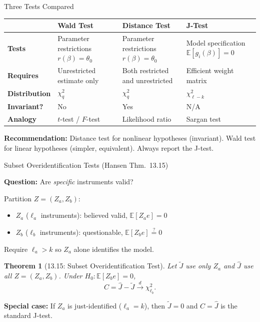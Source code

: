 \documentclass[aspectratio=169, handout]{beamer}
\newtheorem{thm}{Theorem}
\numberwithin{equation}{section}
\begin{document}
\begin{frame}{Three Tests Compared}

\begin{table}[h]
\centering
\small
\begin{tabular}{p{2.8cm}p{3.5cm}p{3cm}p{3.5cm}}
\toprule
& \textbf{Wald Test} & \textbf{Distance Test} & \textbf{J-Test} \\
\midrule
\textbf{Tests} & Parameter restrictions $r(\beta) = \theta_0$ & Parameter restrictions $r(\beta) = \theta_0$ & Model specification $\mathbb{E}[g_i(\beta)] = 0$ \\[4pt]
\textbf{Requires} & Unrestricted estimate only & Both restricted and unrestricted & Efficient weight matrix \\[4pt]
\textbf{Distribution} & $\chi^2_q$ & $\chi^2_q$ & $\chi^2_{\ell - k}$ \\[4pt]
\textbf{Invariant?} & \alert{No} & Yes & N/A \\[4pt]
\textbf{Analogy} & $t$-test / $F$-test & Likelihood ratio & Sargan test \\
\bottomrule
\end{tabular}
\end{table}

\smallskip
\begin{tcolorbox}[colback=blue!5, colframe=blue!50]
\textbf{Recommendation:} Distance test for nonlinear hypotheses (invariant). Wald test for linear hypotheses (simpler, equivalent). Always report the J-test.
\end{tcolorbox}

\end{frame}

\begin{frame}{Subset Overidentification Tests (Hansen Thm.~13.15)}

\textbf{Question:} Are \textit{specific} instruments valid?

\smallskip
Partition $Z = (Z_a, Z_b)$:
\begin{itemize}\itemsep=1pt
\item $Z_a$ ($\ell_a$ instruments): believed valid, $\mathbb{E}[Z_a e] = 0$
\item $Z_b$ ($\ell_b$ instruments): questionable, $\mathbb{E}[Z_b e] \stackrel{?}{=} 0$
\end{itemize}
Require $\ell_a > k$ so $Z_a$ alone identifies the model.

\begin{thm}[13.15: Subset Overidentification Test]
Let $\tilde J$ use only $Z_a$ and $\hat J$ use all $Z = (Z_a, Z_b)$. Under $H_0: \mathbb{E}[Z_b e] = 0$,
$$C = \hat J - \tilde J \xrightarrow{d} \chi^2_{\ell_b}.$$
\end{thm}

\smallskip
\textbf{Special case:} If $Z_a$ is just-identified ($\ell_a = k$), then $\tilde J = 0$ and $C = \hat J$ is the standard J-test.

\end{frame}
\end{document}
